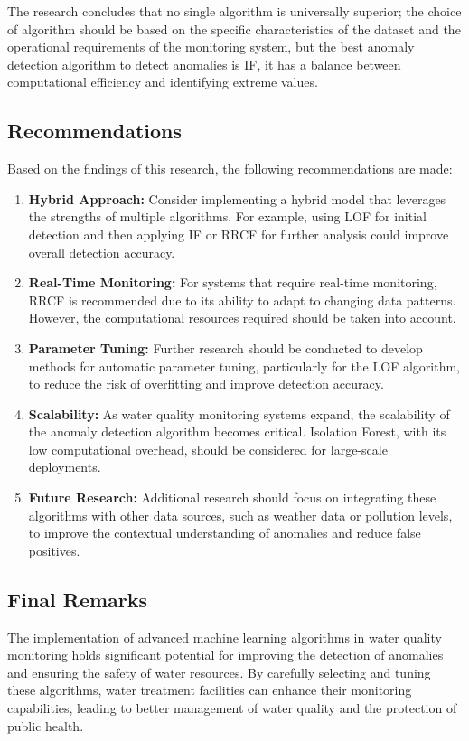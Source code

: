 \documentclass[12pt]{report}
\begin{document}
The research concludes that no single algorithm is universally superior; the choice of algorithm should be based on the specific characteristics of the dataset and the operational requirements of the monitoring system, but  the  best  anomaly  detection algorithm to detect  anomalies  is  IF, it  has a  balance  between  computational efficiency  and  identifying  extreme  values. 

\subsection{Recommendations}
Based on the findings of this research, the following recommendations are made:

\begin{enumerate}
    \item \textbf{Hybrid Approach:} Consider implementing a hybrid model that leverages the strengths of multiple algorithms. For example, using LOF for initial detection and then applying IF or RRCF for further analysis could improve overall detection accuracy.
    \item \textbf{Real-Time Monitoring:} For systems that require real-time monitoring, RRCF is recommended due to its ability to adapt to changing data patterns. However, the computational resources required should be taken into account.
    \item \textbf{Parameter Tuning:} Further research should be conducted to develop methods for automatic parameter tuning, particularly for the LOF algorithm, to reduce the risk of overfitting and improve detection accuracy.
    \item \textbf{Scalability:} As water quality monitoring systems expand, the scalability of the anomaly detection algorithm becomes critical. Isolation Forest, with its low computational overhead, should be considered for large-scale deployments.
    \item \textbf{Future Research:} Additional research should focus on integrating these algorithms with other data sources, such as weather data or pollution levels, to improve the contextual understanding of anomalies and reduce false positives.
\end{enumerate}

\subsection{Final Remarks}
The implementation of advanced machine learning algorithms in water quality monitoring holds significant potential for improving the detection of anomalies and ensuring the safety of water resources. By carefully selecting and tuning these algorithms, water treatment facilities can enhance their monitoring capabilities, leading to better management of water quality and the protection of public health.
\end{document}
